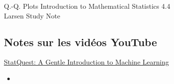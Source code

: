 \begin{CHPT_SUMM_AUTO_NUMB}[label = {L.-41}]{Q.-Q. Plots}
Introduction to Mathematical Statistics 4.4	\\
Larsen Study Note

\tcbline


\end{CHPT_SUMM_AUTO_NUMB}

\subsection{Notes sur les vidéos YouTube}

\begin{YTB_SUMM}[label = {SQ-BASICS-ML-INTRO}]{\href{https://www.youtube.com/watch?v=Gv9_4yMHFhI&list=PLblh5JKOoLUICTaGLRoHQDuF_7q2GfuJF&index=2&t=0s}{StatQuest: A Gentle Introduction to Machine Learning}}
\begin{itemize}
	\item	
\end{itemize}
\end{YTB_SUMM}

